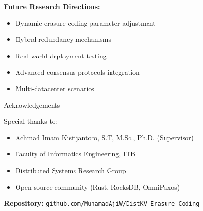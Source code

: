 \documentclass[a0,landscape]{config/poster/a0poster}
\newcommand{\postersection}[1]{%
  \begin{tcolorbox}[
      colback=ITBblue,
      colframe=ITBblue,
      fonttitle=\bfseries,
      coltext=white,
      sharp corners,
      boxrule=0pt,
      top=6pt,
      bottom=6pt,
      halign=center
    ]
    \Large #1
  \end{tcolorbox}%
}
\begin{document}
\begin{multicols}{4}
	\textbf{Future Research Directions:}
	\begin{itemize}
		\item Dynamic erasure coding parameter adjustment
		\item Hybrid redundancy mechanisms
		\item Real-world deployment testing
		\item Advanced consensus protocols integration
		\item Multi-datacenter scenarios
	\end{itemize}


	\postersection{Acknowledgements}
	
	Special thanks to:
	\begin{itemize}
		\item Achmad Imam Kistijantoro, S.T, M.Sc., Ph.D. (Supervisor)
		\item Faculty of Informatics Engineering, ITB
		\item Distributed Systems Research Group
		\item Open source community (Rust, RocksDB, OmniPaxos)
	\end{itemize}

	\vspace{0.5cm}
	\textbf{Repository:} \texttt{github.com/MuhamadAjiW/DistKV-Erasure-Coding}

\end{multicols}
\end{document}

